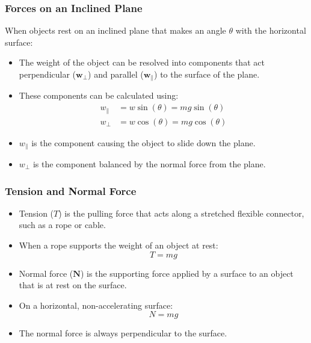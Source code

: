 \documentclass{beamer}
\begin{document}
\begin{frame}
\frametitle{Forces on an Inclined Plane}
When objects rest on an inclined plane that makes an angle $\theta$ with the horizontal surface:
\begin{itemize}
    \item The weight of the object can be resolved into components that act perpendicular ($\mathbf{w}_{\perp}$) and parallel ($\mathbf{w}_{\|}$) to the surface of the plane.
    \item These components can be calculated using:
    \begin{align*}
    w_{\|} &= w \sin(\theta) = mg \sin(\theta) \\
    w_{\perp} &= w \cos(\theta) = mg \cos(\theta)
    \end{align*}
    \item $w_{\|}$ is the component causing the object to slide down the plane.
    \item $w_{\perp}$ is the component balanced by the normal force from the plane.
\end{itemize}
\end{frame}

\begin{frame}
\frametitle{Tension and Normal Force}
\begin{itemize}
    \item Tension ($T$) is the pulling force that acts along a stretched flexible connector, such as a rope or cable.
    \item When a rope supports the weight of an object at rest:
    \[T = mg\]
    \item Normal force ($\mathbf{N}$) is the supporting force applied by a surface to an object that is at rest on the surface.
    \item On a horizontal, non-accelerating surface:
    \[N = mg\]
    \item The normal force is always perpendicular to the surface.
\end{itemize}
\end{frame}
\end{document}
